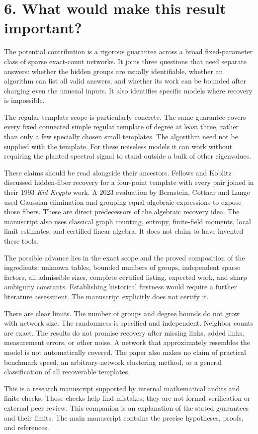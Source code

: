 \documentclass[11pt]{article}
\begin{document}
\newpage
\section*{6. What would make this result important?}
The potential contribution is a rigorous guarantee across a broad
fixed-parameter class of sparse exact-count networks. It joins three
questions that need separate answers: whether the hidden groups are
usually identifiable, whether an algorithm can list all valid answers,
and whether its work can be bounded after charging even the unusual
inputs. It also identifies specific models where recovery is impossible.

The regular-template scope is particularly concrete. The same
guarantee covers every fixed connected simple regular template of
degree at least three, rather than only a few specially chosen small
templates. The algorithm need not be supplied with the template.
For these noiseless models it can work without requiring the planted
spectral signal to stand outside a bulk of other eigenvalues.

These claims should be read alongside their ancestors. Fellows and
Koblitz discussed hidden-fiber recovery for a four-point template with
every pair joined in their 1993 \emph{Kid Krypto} work. A 2023 evaluation by
Bernstein, Cottaar and Lange used Gaussian elimination and grouping
equal algebraic expressions to expose those fibers. These are direct
predecessors of the algebraic recovery idea. The manuscript also uses
classical graph counting, entropy, finite-field moments, local limit
estimates, and certified linear algebra. It does not claim to have
invented these tools.

The possible advance lies in the exact scope and the proved composition
of the ingredients: unknown tables, bounded numbers of groups,
independent sparse factors, all admissible sizes, complete certified
listing, expected work, and sharp ambiguity constants. Establishing
historical firstness would require a further literature assessment.
The manuscript explicitly does not certify it.

There are clear limits. The number of groups and degree bounds do not
grow with network size. The randomness is specified and independent.
Neighbor counts are exact. The results do not promise recovery after
missing links, added links, measurement errors, or other noise. A
network that approximately resembles the model is not automatically
covered. The paper also makes no claim of practical benchmark speed,
an arbitrary-network clustering method, or a general classification
of all recoverable templates.

This is a research manuscript supported by internal mathematical
audits and finite checks. Those checks help find mistakes; they are
not formal verification or external peer review. This companion is
an explanation of the stated guarantees and their limits. The main
manuscript contains the precise hypotheses, proofs, and references.
\end{document}

